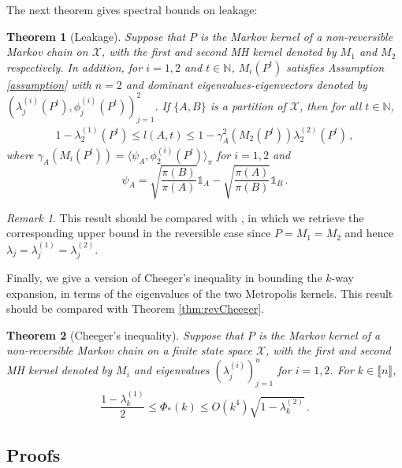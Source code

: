 \documentclass[12pt,a4]{amsart}
\numberwithin{equation}{section}
\theoremstyle{plain}
\newtheorem{theorem}{Theorem}[section]
\theoremstyle{definition}
\theoremstyle{remark}
\newtheorem{rk}{Remark}[section]
\newcommand{\1}{\mathds{1}}
\renewcommand{\leq}{\leqslant}
\begin{document}
The next theorem gives spectral bounds on leakage:

\begin{theorem}[Leakage]\label{thm:mainMH2}
	Suppose that $P$ is the Markov kernel of a non-reversible Markov chain on $\mathcal{X}$, with the first and second MH kernel denoted by $M_1$ and $M_2$ respectively. In addition, for $i = 1,2$ and $t \in \mathbb{N}$, $M_i(P^t)$ satisfies Assumption \ref{assumption} with $n=2$ and dominant eigenvalues-eigenvectors denoted by $(\lambda_j^{(i)}(P^t), \phi_j^{(i)}(P^t))_{j=1}^2$. If $\{A,B\}$ is a partition of $\mathcal{X}$, then for all $t \in \mathbb{N}$, 
	\begin{align*}
	1 - \lambda_2^{(1)}(P^t) \leq l(A,t) \leq 1 - \gamma_A^2(M_2(P^t)) \lambda_2^{(2)}(P^t)\,,
	\end{align*}
	where $\gamma_A(M_i(P^t)) = \langle \psi_A, \phi_2^{(i)}(P^t) \rangle_{\pi}$ for $i = 1,2$ and 
	$$\psi_A = \sqrt{\dfrac{\pi(B)}{\pi(A)}} \1_A - \sqrt{\dfrac{\pi(A)}{\pi(B)}} \1_B\,.$$
\end{theorem}

\begin{rk}
	This result should be compared with \cite[Theorem $5$]{S84}, in which we retrieve the corresponding upper bound in the reversible case since $P = M_1 = M_2$ and hence $\lambda_j = \lambda_j^{(1)} = \lambda_j^{(2)}$.
\end{rk}

Finally, we give a version of Cheeger's inequality in bounding the $k$-way expansion, in terms of the eigenvalues of the two Metropolis kernels. This result should be compared with Theorem \ref{thm:revCheeger}.

\begin{theorem}[Cheeger's inequality]\label{thm:Cheeger}
	Suppose that $P$ is the Markov kernel of a non-reversible Markov chain on a finite state space $\mathcal{X}$, with the first and second MH kernel denoted by $M_i$ and eigenvalues $(\lambda_j^{(i)})_{j=1}^n$ for $i=1,2$. For $k \in \llbracket n \rrbracket$,
	\begin{align}\label{eq:Cheeger}
	\dfrac{1-\lambda_k^{(1)}}{2} \leq \Phi_*(k) \leq O(k^4) \sqrt{1-\lambda_k^{(2)}}\,.
	\end{align}
\end{theorem}



\subsection{Proofs}\label{sec:proof}
\end{document}
